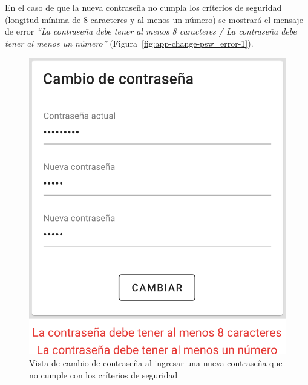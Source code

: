 En el caso de que la nueva contraseña no cumpla los críterios de seguridad (longitud mínima de 8 caracteres y al menos un número) se mostrará el mensaje de error  \textit{“La contraseña debe tener al menos 8 caracteres / La contraseña debe tener al menos un número”} (Figura~\ref{fig:app-change-psw_error-1}).
\begin{figure}[H]
    \includegraphics[width=0.45\linewidth]{images/app/change-psw-error3.png}
    \captionsetup{justification=raggedright, width=0.45\linewidth, singlelinecheck=off}

    \caption{Vista de cambio de contraseña al ingresar una nueva contraseña que no cumple con los críterios de seguridad}
    \label{fig:app-change-psw_error-3}
\end{figure}




